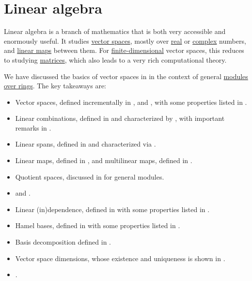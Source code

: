 \chapter{Linear algebra}\label{ch:linear_algebra}

Linear algebra is a branch of mathematics that is both very accessible and enormously useful. It studies \hyperref[def:vector_space]{vector spaces}, mostly over \hyperref[def:real_numbers]{real} or \hyperref[def:complex_numbers]{complex} numbers, and \hyperref[def:linear_function]{linear maps} between them. For \hyperref[thm:vector_space_dimension]{finite-dimensional} vector spaces, this reduces to studying \hyperref[def:array/matrix]{matrices}, which also leads to a very rich computational theory.

We have discussed the basics of vector spaces in  in the context of general \hyperref[def:module]{modules over rings}. The key takeaways are:
\begin{itemize}
  \item Vector spaces, defined incrementally in ,  and , with some properties listed in .
  \item Linear combinations, defined in  and characterized by , with important remarks in .
  \item Linear spans, defined in  and characterized via .
  \item Linear maps, defined in , and multilinear maps, defined in .
  \item Quotient spaces, discussed in  for general modules.
  \item {} and .
  \item Linear (in)dependence, defined in  with some properties listed in .
  \item Hamel bases, defined in  with some properties listed in .
  \item Basis decomposition defined in .
  \item Vector space dimensions, whose existence and uniqueness is shown in .
  \item {}.
\end{itemize}
